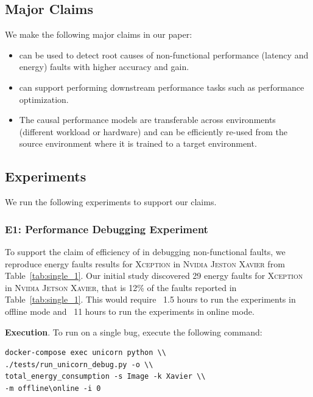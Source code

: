 \subsection{Major Claims}
We make the following major claims in our paper:
\begin{itemize}
\item \ourapproach can be used to detect root causes of non-functional performance (latency and energy) faults with higher accuracy and gain.

\item \ourapproach can support performing downstream performance tasks such as performance optimization.

\item The causal performance models are transferable across environments (different workload or hardware) and can be efficiently re-used from the source environment where it is trained to a target environment.
\end{itemize}

\subsection{Experiments}
We run the following experiments to support our claims.

\subsubsection{E1: Performance Debugging Experiment} To support the claim of efficiency of \ourapproach in debugging non-functional faults, we reproduce energy faults results for \textsc{Xception} in \textsc{Nvidia Jeston Xavier} from Table~\ref{tab:single_1}. Our initial study discovered 29 energy faults for \textsc{Xception} in \textsc{Nvidia Jetson Xavier,} that is 12\% of the faults reported in Table~\ref{tab:single_1}. This would require ~1.5 hours to run the experiments in offline mode and ~11 hours to run the experiments in online mode.

\noindent\textbf{Execution}. To run \ourtool on a single bug, execute the following command:

\begin{verbatim}
docker-compose exec unicorn python \\ 
./tests/run_unicorn_debug.py -o \\
total_energy_consumption -s Image -k Xavier \\
-m offline\online -i 0
\end{verbatim}

